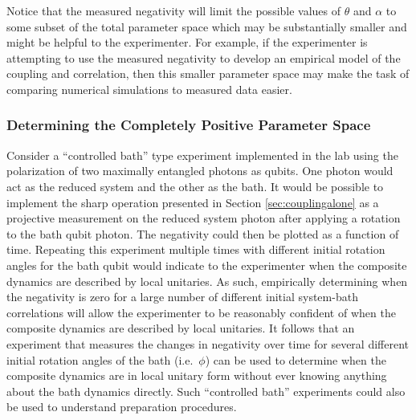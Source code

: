 Notice that the measured negativity will limit the possible values of $\theta$ and $\alpha$ to some subset of the total parameter space which may be substantially smaller and might be helpful to the experimenter.  For example, if the experimenter is attempting to use the measured negativity to develop an empirical model of the coupling and correlation, then this smaller parameter space may make the task of comparing numerical simulations to measured data easier.

\subsubsection{Determining the Completely Positive Parameter Space}

Consider a ``controlled bath'' type experiment implemented in the lab using the polarization of two maximally entangled photons as qubits.  One photon would act as the reduced system and the other as the bath.  It would be possible to implement the sharp operation presented in Section \ref{sec:couplingalone} as a projective measurement on the reduced system photon after applying a rotation to the bath qubit photon.  The negativity could then be plotted as a function of time.  Repeating this experiment multiple times with different initial rotation angles for the bath qubit would indicate to the experimenter when the composite dynamics are described by local unitaries.  As such, empirically determining when the negativity is zero for a large number of different initial system-bath correlations will allow the experimenter to be reasonably confident of when the composite dynamics are described by local unitaries.  It follows that an experiment that measures the changes in negativity over time for several different initial rotation angles of the bath (i.e.\ $\phi$) can be used to determine when the composite dynamics are in local unitary form without ever knowing anything about the bath dynamics directly.  Such ``controlled bath'' experiments could also be used to understand preparation procedures.
 
